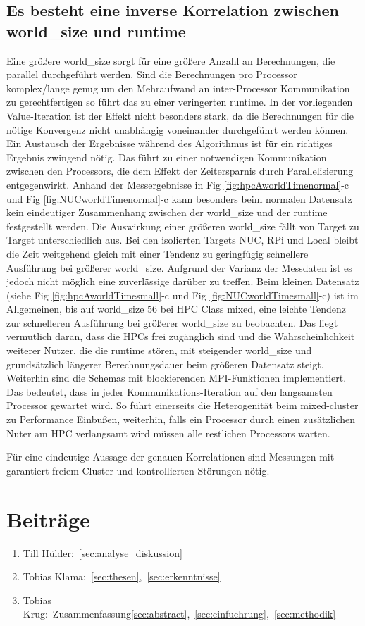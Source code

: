 \subsection{Es besteht eine inverse Korrelation zwischen world\_size und runtime}

Eine größere world\_size sorgt für eine größere Anzahl an Berechnungen, die parallel durchgeführt werden.
Sind die Berechnungen pro Processor komplex/lange genug um den Mehraufwand an inter-Processor Kommunikation zu
gerechtfertigen so führt das zu einer veringerten runtime.
In der vorliegenden Value-Iteration ist der Effekt nicht besonders stark, da die Berechnungen für die nötige
Konvergenz nicht unabhängig voneinander durchgeführt werden können. Ein Austausch der Ergebnisse während des Algorithmus ist für ein
richtiges Ergebnis zwingend nötig. Das führt zu einer notwendigen Kommunikation zwischen den Processors,
die dem Effekt der Zeitersparnis durch Parallelisierung entgegenwirkt.
Anhand der Messergebnisse in Fig \ref{fig:hpcAworldTimenormal}-c und Fig \ref{fig:NUCworldTimenormal}-c kann besonders beim normalen Datensatz
kein eindeutiger Zusammenhang zwischen der world\_size und der runtime festgestellt werden.
Die Auswirkung einer größeren world\_size fällt von Target zu Target unterschiedlich aus.
Bei den isolierten Targets NUC, RPi und Local bleibt die Zeit weitgehend gleich mit einer Tendenz zu geringfügig schnellere Ausführung
bei größerer world\_size. Aufgrund der Varianz der Messdaten ist es jedoch nicht möglich eine zuverlässige darüber zu treffen.
Beim kleinen Datensatz (siehe Fig \ref{fig:hpcAworldTimesmall}-c und Fig \ref{fig:NUCworldTimesmall}-c) ist im Allgemeinen,
bis auf world\_size 56 bei HPC Class mixed, eine leichte Tendenz zur schnelleren Ausführung bei größerer world\_size zu beobachten.
Das liegt vermutlich daran, dass die HPCs frei zugänglich sind und die Wahrscheinlichkeit weiterer Nutzer, die die runtime
stören, mit steigender world\_size und grundsätzlich längerer Berechnungsdauer beim größeren Datensatz steigt.
Weiterhin sind die Schemas mit blockierenden MPI-Funktionen implementiert. Das bedeutet, dass in jeder Kommunikations-Iteration
auf den langsamsten Processor gewartet wird. So führt einerseits die Heterogenität beim mixed-cluster zu Performance Einbußen,
weiterhin, falls ein Processor durch einen zusätzlichen Nuter am HPC verlangsamt wird müssen alle restlichen Processors warten.

Für eine eindeutige Aussage der genauen Korrelationen sind Messungen mit garantiert freiem Cluster und kontrollierten Störungen nötig.

\section{Beiträge}
\label{sec:beitraege}

\begin{enumerate}
    \item Till Hülder:~\ref{sec:analyse_diskussion}
    \item Tobias Klama:~\ref{sec:thesen},~\ref{sec:erkenntnisse}
    \item Tobias Krug:~Zusammenfassung\ref{sec:abstract},~\ref{sec:einfuehrung},~\ref{sec:methodik}
\end{enumerate}
